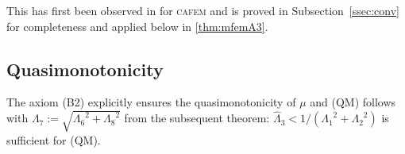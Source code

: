 \documentclass{siamltex1213}
\begin{document}
	This has first been observed  in \cite{CFP14} for {\textsc{cafem}\xspace} and is proved in 
	Subsection~\ref{ssec:conv} for completeness and applied below in \cref{thm:mfemA3}. 

	\subsection{Quasimonotonicity}\label{ssec:remQM} 
	The axiom (B2) explicitly ensures the 
	quasimonotonicity of $\mu$ and (QM) follows 
	with  ${\ensuremath{\Lambda_{\mathrm{7}}}}:=\sqrt{{\ensuremath{\Lambda_{\mathrm{6}}}}^2+{\ensuremath{\Lambda_{\mathrm{8}}}}^2}$
	from the subsequent theorem: ${\ensuremath{\widehat{\Lambda}_{\mathrm{3}}}} < 1/({\ensuremath{\Lambda_{\mathrm{1}}}}^2+{\ensuremath{\Lambda_{\mathrm{2}}}}^2)$ is sufficient for  (QM). 
\end{document}
